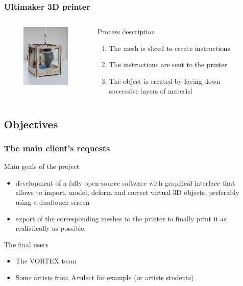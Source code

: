 \documentclass{beamer}
\begin{document}
\begin{frame}
	\frametitle{Ultimaker 3D printer}
	
	\begin{columns}[t]
  	\begin{column}{5cm}
  		\begin{figure}
		\includegraphics[width=4cm]{Ultimaker}	
		\end{figure}
  	\end{column}
  
  	\begin{column}{5cm}
  		\begin{block}{Process description}
  		\begin{enumerate}
  		\item The mesh is sliced to create instructions
  		\item The instructions are sent to the printer
  		\item The object is created by laying down successive layers of material
  		\end{enumerate}
 	 	\end{block}   
  	\end{column}
 	\end{columns}  
\end{frame}


\subsection{Objectives}
\begin{frame}
	\frametitle{The main client's requests}
	\begin{block}{Main goals of the project} 
	\begin{itemize}	
		\item development of a fully open-source software with graphical interface that allows to import, model, deform and correct virtual 3D objects, preferably using a dualtouch screen
		\item export of the corresponding meshes to the printer to finally print it as realistically as possible.
	\end{itemize}
    \end{block}
    
    \begin{block}{The final users}
    	\begin{itemize}
		\item The \textsc{VORTEX} team
		\item Some artists from Artilect for example (or artists students)
		\end{itemize}
    \end{block}
    
\end{frame}
\end{document}
